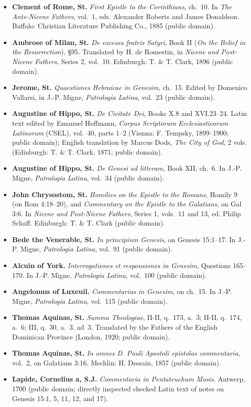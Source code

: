 \begin{itemize}
\item \textbf{Clement of Rome, St.} \emph{First Epistle to the Corinthians}, ch.~10. In \emph{The Ante-Nicene Fathers}, vol.~1, eds. Alexander Roberts and James Donaldson. Buffalo: Christian Literature Publishing Co., 1885 (public domain).
\item \textbf{Ambrose of Milan, St.} \emph{De excessu fratris Satyri}, Book II (\emph{On the Belief in the Resurrection}), \S 95. Translated by H. de Romestin, in \emph{Nicene and Post-Nicene Fathers}, Series 2, vol.~10. Edinburgh: T. \& T. Clark, 1896 (public domain).
\item \textbf{Jerome, St.} \emph{Quaestiones Hebraicae in Genesim}, ch.~15. Edited by Domenico Vallarsi, in J.-P. Migne, \emph{Patrologia Latina}, vol.~23 (public domain).
\item \textbf{Augustine of Hippo, St.} \emph{De Civitate Dei}, Books X.8 and XVI.23--24. Latin text edited by Emanuel Hoffmann, \emph{Corpus Scriptorum Ecclesiasticorum Latinorum} (CSEL), vol.~40, parts 1--2 (Vienna: F. Tempsky, 1899--1900; public domain); English translation by Marcus Dods, \emph{The City of God}, 2 vols. (Edinburgh: T. \& T. Clark, 1871; public domain).
\item \textbf{Augustine of Hippo, St.} \emph{De Genesi ad litteram}, Book XII, ch.~6. In J.-P. Migne, \emph{Patrologia Latina}, vol.~34 (public domain).
\item \textbf{John Chrysostom, St.} \emph{Homilies on the Epistle to the Romans}, Homily 9 (on Rom 4:18--20), and \emph{Commentary on the Epistle to the Galatians}, on Gal 3:6. In \emph{Nicene and Post-Nicene Fathers}, Series 1, vols.~11 and 13, ed. Philip Schaff. Edinburgh: T. \& T. Clark (public domain).
\item \textbf{Bede the Venerable, St.} \emph{In principium Genesis}, on Genesis 15:1--17. In J.-P. Migne, \emph{Patrologia Latina}, vol.~91 (public domain).
\item \textbf{Alcuin of York.} \emph{Interrogationes et responsiones in Genesim}, Questions 165--170. In J.-P. Migne, \emph{Patrologia Latina}, vol.~100 (public domain).
\item \textbf{Angelomus of Luxeuil.} \emph{Commentarius in Genesim}, on ch.~15. In J.-P. Migne, \emph{Patrologia Latina}, vol.~115 (public domain).
\item \textbf{Thomas Aquinas, St.} \emph{Summa Theologiae}, II-II, q.~173, a.~3; II-II, q.~174, a.~6; III, q.~30, a.~3, ad~3. Translated by the Fathers of the English Dominican Province (London, 1920; public domain).
\item \textbf{Thomas Aquinas, St.} \emph{In omnes D. Pauli Apostoli epistolas commentaria}, vol.~2, on Galatians 3:16. Mechlin: H. Dessain, 1857 (public domain).
\item \textbf{Lapide, Cornelius a, S.J.} \emph{Commentaria in Pentateuchum Mosis}. Antwerp, 1700 (public domain; directly inspected checked Latin text of notes on Genesis 15:1, 5, 11, 12, and 17).
\end{itemize}
